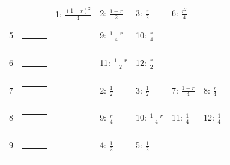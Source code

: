 \documentclass[9pt,letterpaper,twoside]{article}
\begin{document}
{\begin{center}
\begin{tabular}{cccllll}
&
& 1: $\frac{(1-r)^2}{4}$
& 2: $\frac{1-r}{2}$
& 3: $\frac{r}{2}$
& 6: $\frac{r^2}{4}$
\\
5 &
{\renewcommand{\arraystretch}{0.3}
\renewcommand{\tabcolsep}{0.5mm}
\parbox[b][3mm][c]{12mm}{
\begin{tabular}{|p{2mm}|p{2mm}||p{2mm}|} \hline
$\circ  $ &           & $\bullet$ \\
          & $\circ  $ & $\bullet$ \\ \hline
\end{tabular}}}
&
& 9: $\frac{1-r}{4}$
& 10: $\frac{r}{4}$
& & \\
6 &
{\renewcommand{\arraystretch}{0.3}
\renewcommand{\tabcolsep}{0.5mm}
\parbox[b][3mm][c]{12mm}{
\begin{tabular}{|p{2mm}|p{2mm}||p{2mm}|} \hline
$\bullet$ & $\circ  $ &           \\
$\circ  $ & $\bullet$ &           \\ \hline
\end{tabular}}}
&
& 11: $\frac{1-r}{2}$
& 12: $\frac{r}{2}$
& & \\
7 &
{\renewcommand{\arraystretch}{0.3}
\renewcommand{\tabcolsep}{0.5mm}
\parbox[b][3mm][c]{12mm}{
\begin{tabular}{|p{2mm}|p{2mm}||p{2mm}|} \hline
$\bullet$ & $\circ  $ &           \\
          & $\circ  $ & $\bullet$ \\ \hline
\end{tabular}}}
&
& 2: $\frac{1}{2}$
& 3: $\frac{1}{2}$
& 7: $\frac{1-r}{4}$
& 8: $\frac{r}{4}$
\\
8 &
{\renewcommand{\arraystretch}{0.3}
\renewcommand{\tabcolsep}{0.5mm}
\parbox[b][3mm][c]{12mm}{
\begin{tabular}{|p{2mm}|p{2mm}||p{2mm}|} \hline
$\bullet$ & $\circ  $ &           \\
$\circ  $ &           & $\bullet$ \\ \hline
\end{tabular}}}
&
& 9: $\frac{r}{4}$
& 10: $\frac{1-r}{4}$
& 11: $\frac{1}{4}$
& 12: $\frac{1}{4}$
\\
9 &
{\renewcommand{\arraystretch}{0.3}
\renewcommand{\tabcolsep}{0.5mm}
\parbox[b][3mm][c]{12mm}{
\begin{tabular}{|p{2mm}|p{2mm}||p{2mm}|} \hline
$\bullet$ & $\circ  $ &           \\
$\bullet$ &           & $\circ  $ \\ \hline
\end{tabular}}}
&
& 4: $\frac{1}{2}$
& 5: $\frac{1}{2}$

\end{tabular}
\end{center}}
\end{document}
